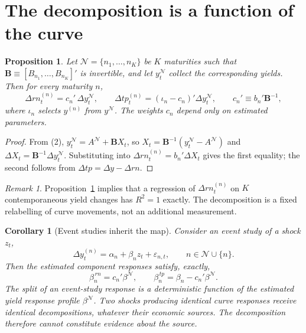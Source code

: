 \documentclass[11pt]{article}
\newtheorem{proposition}{Proposition}
\newtheorem{corollary}{Corollary}
\theoremstyle{remark}\newtheorem{remark}{Remark}
\begin{document}
\section{The decomposition is a function of the curve}

\begin{proposition}\label{prop:span}
Let $\mathcal{N}=\{n_1,\dots,n_K\}$ be $K$ maturities such that $\mathbf{B}\equiv[B_{n_1},\dots,B_{n_K}]'$ is invertible, and let $y_t^{\mathcal N}$ collect the corresponding yields. Then for every maturity $n$,
\begin{equation}
\Delta rn_t^{(n)}=c_n'\,\Delta y_t^{\mathcal N},
\qquad
\Delta tp_t^{(n)}=\left(\iota_n-c_n\right)'\Delta y_t^{\mathcal N},
\qquad
c_n'\equiv b_n'\mathbf{B}^{-1},
\label{eq:cn}
\end{equation}
where $\iota_n$ selects $y^{(n)}$ from $y^{\mathcal N}$. The weights $c_n$ depend only on estimated parameters.
\end{proposition}

\begin{proof}
From (2), $y_t^{\mathcal N}=A^{\mathcal N}+\mathbf{B}X_t$, so $X_t=\mathbf{B}^{-1}(y_t^{\mathcal N}-A^{\mathcal N})$ and $\Delta X_t=\mathbf{B}^{-1}\Delta y_t^{\mathcal N}$. Substituting into $\Delta rn_t^{(n)}=b_n'\Delta X_t$ gives the first equality; the second follows from $\Delta tp=\Delta y-\Delta rn$.
\end{proof}

\begin{remark}
Proposition~\ref{prop:span} implies that a regression of $\Delta rn_t^{(n)}$ on $K$ contemporaneous yield changes has $R^2=1$ exactly. The decomposition is a fixed relabelling of curve movements, not an additional measurement.
\end{remark}

\begin{corollary}[Event studies inherit the map]\label{cor:event}
Consider an event study of a shock $z_t$,
\[
\Delta y_t^{(n)}=\alpha_n+\beta_n z_t+\varepsilon_{n,t},\qquad n\in\mathcal N\cup\{n\}.
\]
Then the estimated component responses satisfy, exactly,
\begin{equation}
\beta_n^{\,rn}=c_n'\beta^{\mathcal N},
\qquad
\beta_n^{\,tp}=\beta_n-c_n'\beta^{\mathcal N}.
\end{equation}
The split of an event-study response is a deterministic function of the estimated \emph{yield} response profile $\beta^{\mathcal N}$. Two shocks producing identical curve responses receive identical decompositions, whatever their economic sources. The decomposition therefore cannot constitute evidence about the source.
\end{corollary}
\end{document}
